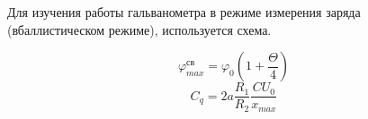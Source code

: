 Для изучения работы гальванометра в режиме измерения заряда (вбаллистическом режиме), используется схема.

\begin{figure}[ht!]
\end{figure}
\[
    \varphi_{max}^{\text{св}} = \varphi_{0}\left(1+\frac{\Theta}{4}\right)
\]
\[
    C_{q} = 2a\frac{R_{1}}{R_{2}}\frac{CU_{0}}{x_{max}}
\]

